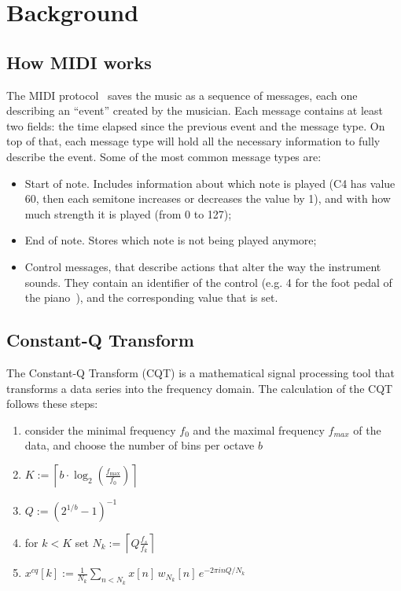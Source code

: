 \documentclass[10pt,twocolumn,letterpaper]{article}
\begin{document}
\section{Background}\label{sec:background}

\subsection{How MIDI works}

The MIDI protocol~\cite{midi-wiki} saves the music as a sequence of messages, each one describing an ``event'' created by the musician.
Each message contains at least two fields: the time elapsed since the previous event and the message type.
On top of that, each message type will hold all the necessary information to fully describe the event.
Some of the most common message types are:
\begin{itemize}
    \item Start of note. Includes information about which note is played (C4 has value \num{60}, then each semitone increases or decreases the value by \num{1}), and with how much strength it is played (from \num{0} to \num{127});
    \item End of note. Stores which note is not being played anymore;
    \item Control messages, that describe actions that alter the way the instrument sounds. They contain an identifier of the control (e.g. \num{4} for the foot pedal of the piano~\cite{midi-control}), and the corresponding value that is set.
\end{itemize}

\subsection{Constant-Q Transform}\label{ssec:CQT}

The Constant-Q Transform (CQT) is a mathematical signal processing tool that transforms a data series into the frequency domain. The calculation of the CQT follows these steps:
\begin{enumerate}
    \item consider the minimal frequency $f_0$ and the maximal frequency $f_{max}$ of the data, and choose the number of bins per octave $b$
    \item $K := \left\lceil b \cdot \log_{2}\!\left(\frac{f_{\max}}{f_0}\right) \right\rceil$
    \item $Q := \left( 2^{1/b} - 1 \right)^{-1}$
    \item for $k<K$ set $N_k := \left\lceil Q \frac{f_s}{f_k} \right\rceil$
    \item $x^{cq}[k] := \frac{1}{N_k} \sum_{n < N_k} x[n]\, w_{N_k}[n]\, e^{-2 \pi i n Q / N_k}$
\end{enumerate}
\end{document}
